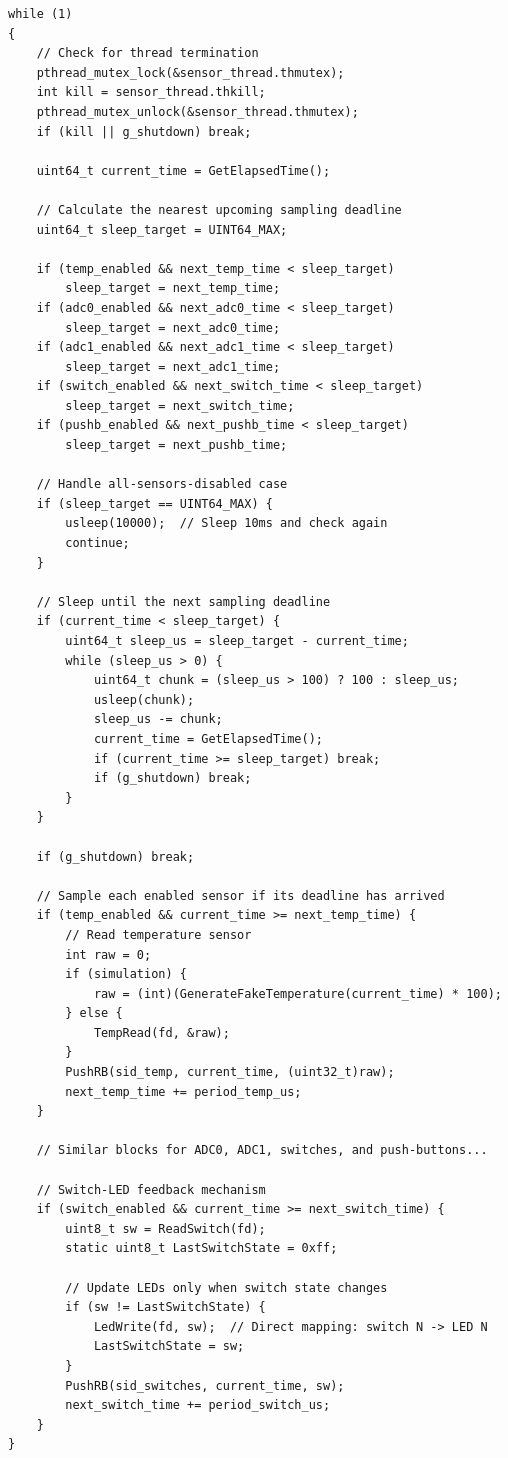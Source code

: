 \begin{verbatim}
while (1)
{
    // Check for thread termination
    pthread_mutex_lock(&sensor_thread.thmutex);
    int kill = sensor_thread.thkill;
    pthread_mutex_unlock(&sensor_thread.thmutex);
    if (kill || g_shutdown) break;
    
    uint64_t current_time = GetElapsedTime();
    
    // Calculate the nearest upcoming sampling deadline
    uint64_t sleep_target = UINT64_MAX;
    
    if (temp_enabled && next_temp_time < sleep_target) 
        sleep_target = next_temp_time;
    if (adc0_enabled && next_adc0_time < sleep_target) 
        sleep_target = next_adc0_time;
    if (adc1_enabled && next_adc1_time < sleep_target) 
        sleep_target = next_adc1_time;
    if (switch_enabled && next_switch_time < sleep_target) 
        sleep_target = next_switch_time;
    if (pushb_enabled && next_pushb_time < sleep_target) 
        sleep_target = next_pushb_time;
    
    // Handle all-sensors-disabled case
    if (sleep_target == UINT64_MAX) {
        usleep(10000);  // Sleep 10ms and check again
        continue;
    }
    
    // Sleep until the next sampling deadline
    if (current_time < sleep_target) {
        uint64_t sleep_us = sleep_target - current_time;
        while (sleep_us > 0) {
            uint64_t chunk = (sleep_us > 100) ? 100 : sleep_us;
            usleep(chunk);
            sleep_us -= chunk;
            current_time = GetElapsedTime();
            if (current_time >= sleep_target) break;
            if (g_shutdown) break;
        }
    }
    
    if (g_shutdown) break;
    
    // Sample each enabled sensor if its deadline has arrived
    if (temp_enabled && current_time >= next_temp_time) {
        // Read temperature sensor
        int raw = 0;
        if (simulation) {
            raw = (int)(GenerateFakeTemperature(current_time) * 100);
        } else {
            TempRead(fd, &raw);
        }
        PushRB(sid_temp, current_time, (uint32_t)raw);
        next_temp_time += period_temp_us;
    }
    
    // Similar blocks for ADC0, ADC1, switches, and push-buttons...
    
    // Switch-LED feedback mechanism
    if (switch_enabled && current_time >= next_switch_time) {
        uint8_t sw = ReadSwitch(fd);
        static uint8_t LastSwitchState = 0xff;
        
        // Update LEDs only when switch state changes
        if (sw != LastSwitchState) {
            LedWrite(fd, sw);  // Direct mapping: switch N -> LED N
            LastSwitchState = sw;
        }
        PushRB(sid_switches, current_time, sw);
        next_switch_time += period_switch_us;
    }
}
\end{verbatim}
